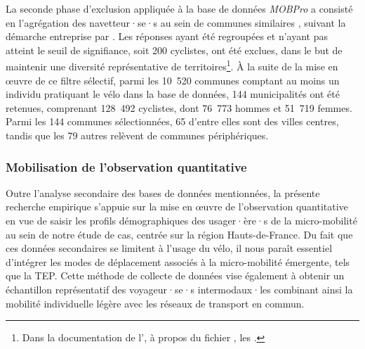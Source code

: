 \begin{refsegment}
La seconde phase d'exclusion appliquée à la base de données \textsl{MOBPro} a consisté en l'agrégation des navetteur·se·s au sein de communes similaires \textcolor{blue}{\autocite{insee_documentation_2023}}, suivant la démarche entreprise par \textcolor{blue}{\textcite[259]{papaix_potential_2022}}. Les réponses ayant été regroupées et n'ayant pas atteint le seuil de signifiance, soit 200 cyclistes, ont été exclues, dans le but de maintenir une diversité représentative de territoires\footnote{
    Dans la documentation de l'\textcolor{blue}{\textcite{insee_documentation_2023}}, à propos du fichier , les .
}. À la suite de la mise en œuvre de ce filtre sélectif, parmi les 10~520 communes comptant au moins un individu pratiquant le vélo dans la base de données, 144 municipalités ont été retenues, comprenant 128~492 cyclistes, dont 76~773 hommes et 51~719 femmes. Parmi les 144 communes sélectionnées, 65 d'entre elles sont des villes centres, tandis que les 79 autres relèvent de communes périphériques.%

\subsubsection*{Mobilisation de l’observation quantitative
    \label{chap4:variables-age-genre-observation-quantitative}
    }

Outre l'analyse secondaire des bases de données mentionnées, la présente recherche empirique s'appuie sur la mise en œuvre de l'observation quantitative en vue de saisir les profils démographiques des usager·ère·s de la micro-mobilité au sein de notre étude de cas, centrée sur la région Hauts-de-France. Du fait que ces données secondaires se limitent à l'usage du vélo, il nous paraît essentiel d'intégrer les modes de déplacement associés à la micro-mobilité émergente, tels que la \acrshort{TEP}. Cette méthode de collecte de données vise également à obtenir un échantillon représentatif des voyageur·se·s intermodaux·les combinant ainsi la mobilité individuelle légère avec les réseaux de transport en commun.%


\end{refsegment}
